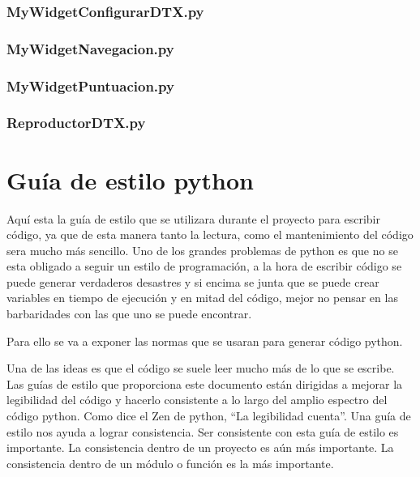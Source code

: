 \documentclass[a4paper,11pt,oneside]{book}
\begin{document}


\subsection{MyWidgetConfigurarDTX.py}



\subsection{MyWidgetNavegacion.py}



\subsection{MyWidgetPuntuacion.py}



\subsection{ReproductorDTX.py}




\chapter{Guía de estilo python}
Aquí esta la guía de estilo que se utilizara durante el proyecto para escribir código, ya que de esta manera tanto la lectura, como el mantenimiento del código sera mucho más sencillo.
Uno de los grandes problemas de python es que no se esta obligado a seguir un estilo de programación, a la hora de escribir código se puede generar verdaderos desastres y si encima se junta que se puede crear variables en tiempo de ejecución y en mitad del código, mejor no pensar en las barbaridades con las que uno se puede encontrar.

Para ello se va a exponer las normas que se usaran para generar código python.

Una de las ideas es que el código se suele leer mucho más de lo que se escribe. Las guías de estilo que proporciona este documento están dirigidas a mejorar la legibilidad del código y hacerlo consistente a lo largo del amplio espectro del código python. Como dice el Zen de python, ``La legibilidad cuenta''.
Una guía de estilo nos ayuda a lograr consistencia. Ser consistente con esta guía de estilo es importante.
La consistencia dentro de un proyecto es aún más importante. La consistencia dentro de un módulo o función es la más importante.
\end{document}
